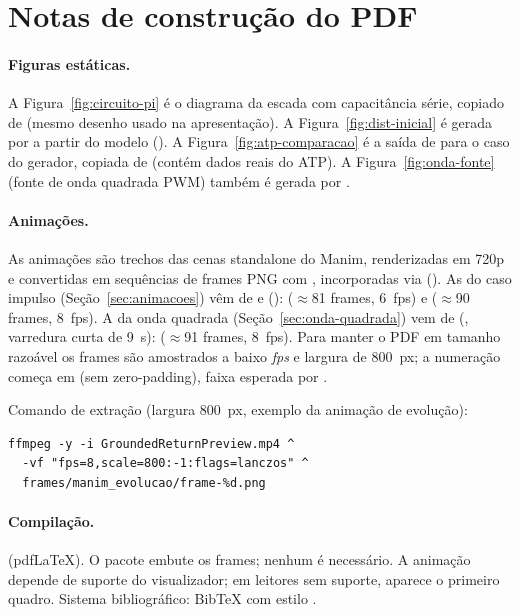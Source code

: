 \section{Notas de construção do PDF}

\paragraph{Figuras estáticas.} A Figura~\ref{fig:circuito-pi} é o diagrama da escada com capacitância
série, copiado de  (mesmo desenho usado na
apresentação). A Figura~\ref{fig:dist-inicial} é gerada por 
a partir do modelo (). A Figura~\ref{fig:atp-comparacao} é a
saída de  para o caso do gerador, copiada de
 (contém dados reais do ATP). A
Figura~\ref{fig:onda-fonte} (fonte de onda quadrada PWM) também é gerada por
.

\paragraph{Animações.} As animações são trechos das cenas standalone do Manim, renderizadas em
720p e convertidas em sequências de frames PNG com , incorporadas via
 (). As do caso impulso (Seção~\ref{sec:animacoes})
vêm de  e 
():  (\(\approx\)81 frames,
\SI{6}{fps}) e  (\(\approx\)90 frames, \SI{8}{fps}). A da onda
quadrada (Seção~\ref{sec:onda-quadrada}) vem de 
(, varredura curta de \SI{9}{\second}):
 (\(\approx\)91 frames, \SI{8}{fps}). Para manter o PDF em tamanho
razoável os frames são amostrados a baixo \emph{fps} e largura de \SI{800}{px}; a numeração começa em
 (sem zero-padding), faixa esperada por .

Comando de extração (largura \SI{800}{px}, exemplo da animação de evolução):

\begin{verbatim}
ffmpeg -y -i GroundedReturnPreview.mp4 ^
  -vf "fps=8,scale=800:-1:flags=lanczos" ^
  frames/manim_evolucao/frame-%d.png
\end{verbatim}

\paragraph{Compilação.}  (pdfLaTeX). O pacote 
embute os frames; nenhum  é necessário. A animação depende de suporte do
visualizador; em leitores sem suporte, aparece o primeiro quadro. Sistema bibliográfico: BibTeX com
estilo .
